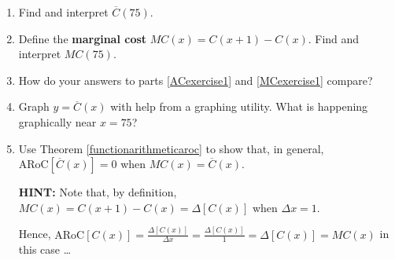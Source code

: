 \documentclass{ximera}
\begin{document}
\begin{question}
\begin{problem}
\begin{enumerate}

\item\label{ACexercise1} Find and interpret $\overline{C}(75)$.

\item\label{MCexercise1}  Define  the \textbf{marginal cost} $MC(x) = C(x+1) - C(x)$.   Find and interpret $MC(75)$.

\item  How do your answers to parts \ref{ACexercise1} and \ref{MCexercise1} compare?

\item Graph $y = \overline{C}(x)$ with help from a graphing utility.  What is happening graphically near $x = 75$?

\item  Use Theorem \ref{functionarithmeticaroc} to show that, in general, $\text{ARoC}[ \overline{C}(x)] = 0$ when $MC(x) = \overline{C}(x)$.



\textbf{HINT:}  Note that, by definition, $MC(x) = C(x+1) - C(x) = \Delta[C(x)]$ when $\Delta x = 1$.  


Hence,  $\text{ARoC}[C(x)] = \frac{\Delta[C(x)]}{\Delta x} = \frac{\Delta[C(x)]}{1} = \Delta[C(x)] = MC(x)$ in this case \ldots 

\end{enumerate}
\end{problem}


\end{question}
\end{document}
